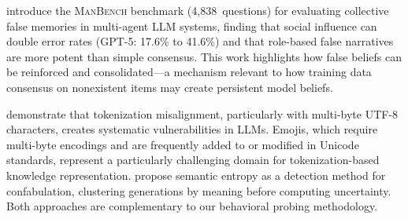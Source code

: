 \citet{xu2026mandela} introduce the \textsc{ManBench} benchmark (4,838~questions) for evaluating collective false memories in multi-agent LLM systems, finding that social influence can double error rates (GPT-5: 17.6\% to 41.6\%) and that role-based false narratives are more potent than simple consensus.
This work highlights how false beliefs can be reinforced and consolidated---a mechanism relevant to how training data consensus on nonexistent items may create persistent model beliefs.

\citet{wang2024tokenization} demonstrate that tokenization misalignment, particularly with multi-byte UTF-8 characters, creates systematic vulnerabilities in LLMs.
Emojis, which require multi-byte encodings and are frequently added to or modified in Unicode standards, represent a particularly challenging domain for tokenization-based knowledge representation.
\citet{farquhar2024semantic} propose semantic entropy as a detection method for confabulation, clustering generations by meaning before computing uncertainty.
Both approaches are complementary to our behavioral probing methodology.
